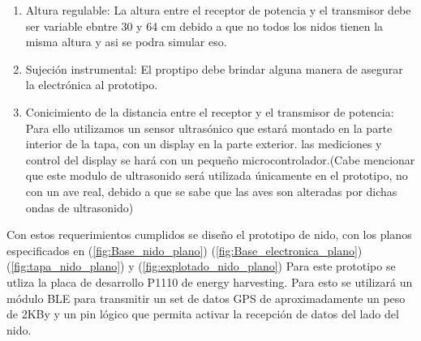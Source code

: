 \begin{enumerate}
También se calcula la impedancia de la madera como:
\begin{equation}
	\eta_{Madera}=\sqrt{\frac{\mu_{Madera}}{\varepsilon_{Madera}}}
\end{equation}

Es así que el coeficiente de reflexión se calcula de la siguiente forma:
\begin{equation}
	\Gamma = \frac{\eta_2 - \eta_1  }{\eta_2 + \eta_1} = -0.1714
	\label{eq:reflexion_madera}
\end{equation}

Se observa en la Ecuación (\ref{eq:reflexion_madera}) que el resultado presenta un valor negativo. Lo que esto implica es una inversión de fase en la onda electromagnética reflejada respecto de la incidente. Esto implica una interferencia destructiva, para determinar las implicancias de esta interferencai se calcula la potencia de la onda reflejada, siendo esta $P_{ref} = |\Gamma|^2 = 0.029$. Es así que se nota que menos de un $3\%$ de la potencia sera reflejada. De esta forma se puede afirmar que no habrá una interferencia significativa con la transmisión original.
Finalmente cabe notar que el resultado del coeficiente de reflexi\'pm no depende del espesor. \'Unicamente de la impedancia de los medios. Por lo que de aqu\'i se concluye que el espesor de la madera no juega un papel significativo en el prototipo de nido.
\item Altura regulable:
La altura entre el receptor de potencia y el transmisor debe ser variable ebntre 30 y 64 cm debido a que no todos los nidos tienen la misma altura y asi se podra simular eso.
\item Sujeci\'on instrumental:
El proptipo debe brindar alguna manera de asegurar la electr\'onica al prototipo.
\item Conicimiento de la distancia entre el receptor y el transmisor de potencia:
Para ello utilizamos un sensor ultrasónico que estará montado en la parte interior de la tapa, con un display en la parte exterior. las mediciones y control del display se hará con un pequeño microcontrolador.(Cabe mencionar que este modulo de ultrasonido ser\'a utilizada \'unicamente en el prototipo, no con un ave real, debido a que se sabe que las aves son alteradas por dichas ondas de ultrasonido)
\end{enumerate} 
Con estos requerimientos cumplidos se diseño el prototipo de nido, con los planos especificados en (\ref{fig:Base_nido_plano}) (\ref{fig:Base_electronica_plano}) (\ref{fig:tapa_nido_plano}) y (\ref{fig:explotado_nido_plano})
Para este prototipo se utliza la placa de desarrollo P1110 de energy harvesting. 
\TBC
{}
Para esto se utilizar\'a un m\'odulo BLE para transmitir un set de datos GPS de aproximadamente un peso de 2KBy y un pin l\'ogico que permita activar la recepci\'on de datos del lado del nido.



